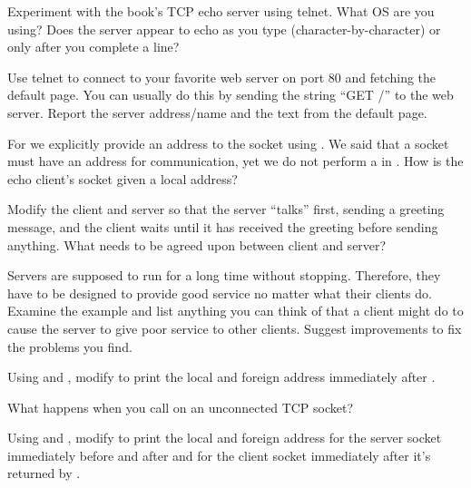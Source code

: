 \begin{exercises}

\item Experiment with the book's TCP echo server using telnet.  What OS are you
using?  Does the server appear to echo as you type (character-by-character) or
only after you complete a line?

\item Use telnet to connect to your favorite web server on port 80 and fetching
the default page.  You can usually do this by sending the string ``GET /'' to
the web server.  Report the server address/name and the text from the default
page.

\item For  we explicitly provide an address to
the socket using .  We said that a socket
must have an address for communication, yet we do not perform a
 in .  How is the echo
client's socket given a local address?

\item Modify the client and server so that the server ``talks'' first,
  sending a greeting message,
  and the client waits until it has received the greeting before
  sending anything.  What needs to be agreed upon between client and
  server?

\item Servers are supposed to run for a long time without stopping.
Therefore, they have to be designed to provide good service no matter
what their clients do.  Examine the example  and
list anything you can think of that a client might do to cause the
server to give poor service to other clients.  Suggest improvements to
fix the problems you find.

\item Using  and , modify
 to print the local and foreign address immediately
after .
\item What happens when you call  on an unconnected
TCP socket?

\item Using  and , modify
 to print the local and foreign address for
the server socket immediately before and after  and for the
client socket immediately after it's returned by .


\end{exercises}
